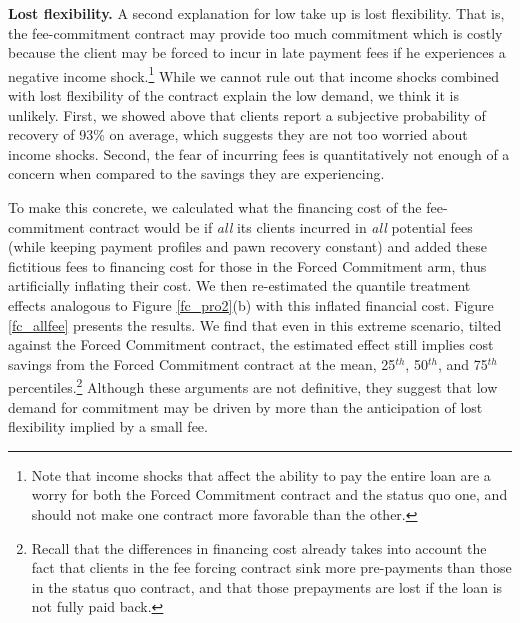 \documentclass[oneside,11pt]{article}
\begin{document}
\vspace{.1in}
\noindent \textbf{Lost flexibility.} A second explanation for low take up is lost flexibility. That is, the fee-commitment contract may provide too much commitment which is costly because the client may be forced to incur in late payment fees if he experiences a negative income shock.\footnote{Note that income shocks that affect the ability to pay the entire loan are a worry for both the Forced Commitment contract and the status quo one, and should not make one contract more favorable than the other.} While we cannot rule out that income shocks combined with lost flexibility of the contract explain the low demand, we think it is unlikely. First, we showed above that clients report a subjective probability of recovery of 93\% on average, which suggests they are not too worried about income shocks. Second, the fear of incurring fees is quantitatively not enough of a concern when compared to the savings they are experiencing. %

To make this concrete, we calculated what the financing cost of the fee-commitment contract would be if \textit{all} its clients incurred in \textit{all} potential fees (while keeping payment profiles and pawn recovery constant) and added these fictitious fees to financing cost for those in the Forced Commitment arm, thus artificially inflating their cost. We then re-estimated the quantile treatment effects analogous to Figure \ref{fc_pro2}(b) with this inflated financial cost. %
Figure \ref{fc_allfee} presents the results. We find that even in this extreme scenario, tilted against the Forced Commitment contract, the estimated effect still implies cost savings from the Forced Commitment contract at the mean, 25$^{th}$, 50$^{th}$, and 75$^{th}$ percentiles.\footnote{Recall that the differences in financing cost already takes into account the fact that clients in the fee forcing contract sink more pre-payments than those in the status quo contract, and that those prepayments are lost if the loan is not fully paid back.}  Although these arguments are not definitive, they suggest that low demand for commitment may be driven by more than the anticipation of lost flexibility implied by a small fee.
\end{document}
